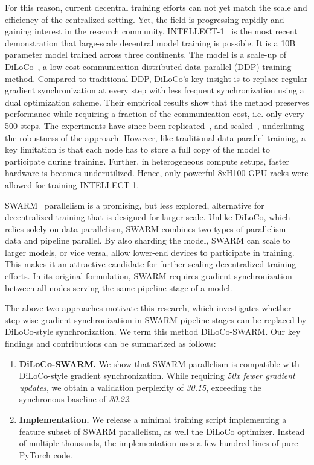 \documentclass{article}
\begin{document}
For this reason, current decentral training efforts can not yet match the scale
and efficiency of the centralized setting. Yet, the field is progressing rapidly
and gaining interest in the research community.
INTELLECT-1~\cite{jaghouar2024intellect1} is the most recent demonstration that
large-scale decentral model training is possible. It is a 10B parameter model
trained across three continents. The model is a scale-up of
DiLoCo~\cite{douillard2023diloco}, a low-cost communication distributed data
parallel (DDP) training method. Compared to traditional DDP, DiLoCo's key
insight is to replace regular gradient synchronization at every step with less
frequent synchronization using a dual optimization scheme. Their empirical
results show that the method preserves performance while requiring a fraction of
the communication cost, i.e. only every 500 steps. The experiments have since
been replicated~\cite{jaghouar2024opendiloco}, and
scaled~\cite{jaghouar2024intellect1}, underlining the robustness of the
approach. However, like traditional data parallel training, a key limitation is
that each node has to store a full copy of the model to participate during
training. Further, in heterogeneous compute setups,  faster hardware is becomes
underutilized. Hence, only powerful 8xH100 GPU racks were allowed for training
INTELLECT-1.

SWARM~\cite{ryabinin2023swarm} parallelism is a promising, but less explored,
alternative for decentralized training that is designed for larger scale. Unlike
DiLoCo, which relies solely on data parallelism, SWARM combines two types of 
parallelism - data and pipeline parallel. By also sharding the model, SWARM can
scale to larger models, or vice versa, allow lower-end devices to participate in
training. This makes it an attractive candidate for further scaling
decentralized training efforts. In its original formulation, SWARM requires
gradient synchronization between all nodes serving the same pipeline stage of a
model. 

The above two approaches motivate this research, which investigates whether
step-wise gradient synchronization in SWARM pipeline stages can be replaced by
DiLoCo-style synchronization. We term this method DiLoCo-SWARM. Our key findings
and contributions can be summarized as follows:

\begin{enumerate}
  \item \textbf{DiLoCo-SWARM.} We show that SWARM parallelism is compatible with
  DiLoCo-style gradient synchronization. While requiring \textit{50x fewer
  gradient updates}, we obtain a validation perplexity of \textit{30.15},
  exceeding the synchronous baseline of \textit{30.22}.
  \item \textbf{Implementation.} We release a minimal training script
  implementing a feature subset of SWARM parallelism, as well the DiLoCo
  optimizer. Instead of multiple thousands, the implementation uses a few
  hundred lines of pure PyTorch code.
\end{enumerate}
\end{document}
